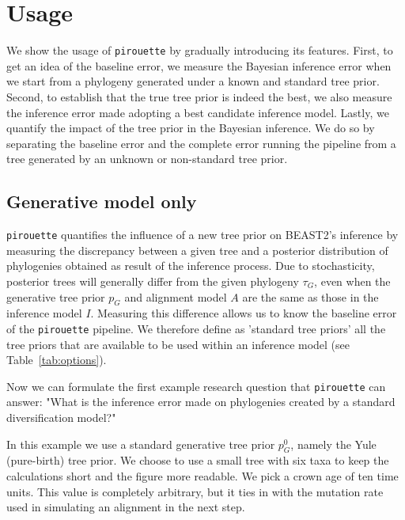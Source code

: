 \section{Usage}

We show the usage of \verb;pirouette; by gradually introducing
its features.
First, to get an idea of the baseline error, we measure the Bayesian inference error when we start from a phylogeny generated under a known and standard tree prior.
Second, to establish that the true tree prior is indeed the best, we also measure the inference error made adopting a
best candidate inference model.
Lastly, we quantify the impact of the tree prior in the Bayesian inference. We do so by separating the baseline error and the complete error running the pipeline from a tree generated by an unknown or non-standard tree prior.

\subsection{Generative model only}

\verb;pirouette; quantifies the influence of a new tree prior on BEAST2's inference by measuring the discrepancy between a given tree and a posterior distribution of phylogenies obtained as result of the inference process. Due to stochasticity, posterior trees will generally differ from the given phylogeny $\tau_{\mathit{G}}$, even when the generative tree prior $\mathit{p_{G}}$ and alignment model $\mathit{A}$ are the same as those in the inference model $\mathit{I}$.
Measuring this difference allows us to know the baseline error
of the \verb;pirouette; pipeline. We therefore define as 'standard tree priors' all the tree priors that are available to be used within an inference model (see Table~\ref{tab:options}).

Now we can formulate the first example research question that \verb;pirouette; can answer: "What is the inference error made on phylogenies created by a standard diversification model?"

In this example we use a standard generative tree prior $\mathit{p_{G}^0}$, namely the Yule (pure-birth) tree prior. 
We choose to use a small tree with six taxa to keep
the calculations short and the figure more readable.
We pick a crown age of ten time units. This value is 
completely arbitrary, but it ties in with the mutation rate 
used in simulating an alignment in the next step.

